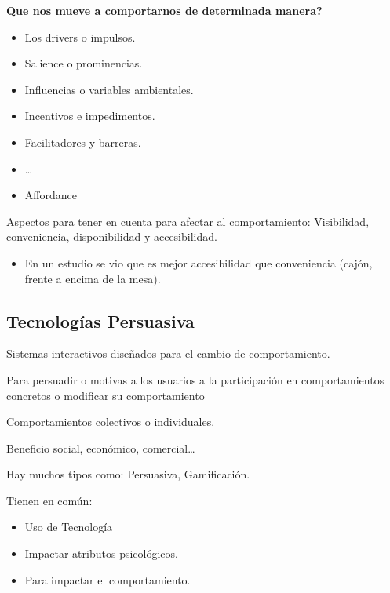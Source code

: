 \documentclass[12pt]{report} %
\begin{document}
\textbf{Que nos mueve a comportarnos de determinada manera?}
\begin{itemize}
  \item Los drivers o impulsos.
  \item Salience o prominencias.
  \item Influencias o variables ambientales.
  \item Incentivos e impedimentos.
  \item Facilitadores y barreras.
  \item \dots
  \item Affordance
\end{itemize}

Aspectos para tener en cuenta para afectar al comportamiento: Visibilidad, conveniencia, disponibilidad y accesibilidad.
\begin{itemize}
  \item En un estudio se vio que es mejor accesibilidad que conveniencia (cajón, frente a encima de la mesa).
\end{itemize}  


\subsection{Tecnologías Persuasiva}
Sistemas interactivos diseñados para el cambio de comportamiento.

Para persuadir o motivas a los usuarios a la participación en comportamientos concretos o modificar su comportamiento 

Comportamientos colectivos o individuales.

Beneficio social, económico, comercial\dots

Hay muchos tipos como: Persuasiva, Gamificación.

Tienen en común:
\begin{itemize}
  \item Uso de Tecnología
  \item Impactar atributos psicológicos.
  \item Para impactar el comportamiento.
\end{itemize}
\end{document}
